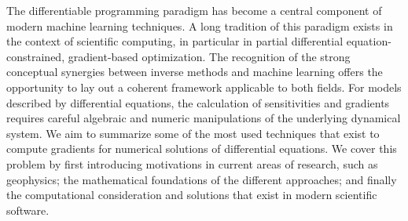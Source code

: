 The differentiable programming paradigm has become a central component of modern machine learning techniques. 
A long tradition of this paradigm exists in the context of scientific computing, in particular in partial differential equation-constrained, gradient-based optimization.
The recognition of the strong conceptual synergies between inverse methods and machine learning offers the opportunity to lay out a coherent framework applicable to both fields.
For models described by differential equations, the calculation of sensitivities and gradients requires careful algebraic and numeric manipulations of the underlying dynamical system.
We aim to summarize some of the most used techniques that exist to compute gradients for numerical solutions of differential equations. 
We cover this problem by first introducing motivations in current areas of research, such as geophysics; the mathematical foundations of the different approaches; and finally the computational consideration and solutions that exist in modern scientific software. 
